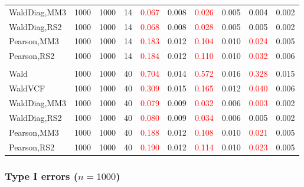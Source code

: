 \documentclass[
]{article}
\begin{document}
\begin{table}[H]
{\begin{tabular}[t]{lrrrrrrlrr}
\hspace{1em}WaldDiag,MM3 & 1000 & 1000 & 14 & \textcolor{red}{0.067} & 0.008 & \textcolor{red}{0.026} & 0.005 & \textcolor{black}{0.004} & 0.002\\
\hspace{1em}WaldDiag,RS2 & 1000 & 1000 & 14 & \textcolor{red}{0.068} & 0.008 & \textcolor{red}{0.028} & 0.005 & \textcolor{black}{0.005} & 0.002\\
\hspace{1em}Pearson,MM3 & 1000 & 1000 & 14 & \textcolor{red}{0.183} & 0.012 & \textcolor{red}{0.104} & 0.010 & \textcolor{red}{0.024} & 0.005\\
\hspace{1em}Pearson,RS2 & 1000 & 1000 & 14 & \textcolor{red}{0.184} & 0.012 & \textcolor{red}{0.110} & 0.010 & \textcolor{red}{0.032} & 0.006\\
\addlinespace[0.3em]
\multicolumn{10}{l}{\textbf{3F 15V}}\\
\hspace{1em}Wald & 1000 & 1000 & 40 & \textcolor{red}{0.704} & 0.014 & \textcolor{red}{0.572} & 0.016 & \textcolor{red}{0.328} & 0.015\\
\hspace{1em}WaldVCF & 1000 & 1000 & 40 & \textcolor{red}{0.309} & 0.015 & \textcolor{red}{0.165} & 0.012 & \textcolor{red}{0.040} & 0.006\\
\hspace{1em}WaldDiag,MM3 & 1000 & 1000 & 40 & \textcolor{red}{0.079} & 0.009 & \textcolor{red}{0.032} & 0.006 & \textcolor{red}{0.003} & 0.002\\
\hspace{1em}WaldDiag,RS2 & 1000 & 1000 & 40 & \textcolor{red}{0.080} & 0.009 & \textcolor{red}{0.034} & 0.006 & \textcolor{black}{0.005} & 0.002\\
\hspace{1em}Pearson,MM3 & 1000 & 1000 & 40 & \textcolor{red}{0.188} & 0.012 & \textcolor{red}{0.108} & 0.010 & \textcolor{red}{0.021} & 0.005\\
\hspace{1em}Pearson,RS2 & 1000 & 1000 & 40 & \textcolor{red}{0.190} & 0.012 & \textcolor{red}{0.114} & 0.010 & \textcolor{red}{0.023} & 0.005\\
\bottomrule
\end{tabular}}
\endgroup{}
\end{table}

\hypertarget{type-i-errors-n1000-1}{%
\subsubsection{\texorpdfstring{Type I errors
(\(n=1000\))}{Type I errors (n=1000)}}\label{type-i-errors-n1000-1}}
\end{document}
